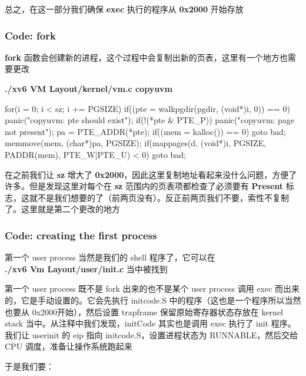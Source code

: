 总之，在这一部分我们确保 \textbf{exec} 执行的程序从 \textbf{0x2000} 开始存放

\subsubsection{Code: fork}

\textbf{fork} 函数会创建新的进程，这个过程中会复制出新的页表，这里有一个地方也需要更改

\textbf{./xv6 VM Layout/kernel/vm.c copyuvm}

\begin{ccode}
    for(i = 0; i < sz; i += PGSIZE){
        if((pte = walkpgdir(pgdir, (void*)i, 0)) == 0)
        panic("copyuvm: pte should exist");
        if(!(*pte & PTE_P))
        panic("copyuvm: page not present");
        pa = PTE_ADDR(*pte);
        if((mem = kalloc()) == 0)
        goto bad;
        memmove(mem, (char*)pa, PGSIZE);
        if(mappages(d, (void*)i, PGSIZE, PADDR(mem), PTE_W|PTE_U) < 0)
        goto bad;
    }
\end{ccode}

在之前我们让 \textbf{sz} 增大了 \textbf{0x2000}，因此这里复制地址看起来没什么问题，方便了许多。但是发现这里对每个在 \textbf{sz} 范围内的页表项都检查了必须要有 \textbf{Present} 标志，这就不是我们想要的了（前两页没有）。反正前两页我们不要，索性不复制了。这里就是第二个更改的地方

\begin{ccode}
    // for(i = 0; i < sz; i += PGSIZE){
    for (i=0x2000; i<sz; i += PGSIZE){
\end{ccode}

\subsubsection{Code: creating the first process}

第一个 user process 当然是我们的 shell 程序了，它可以在 \\
\textbf{./xv6 Vm Layout/user/init.c} 当中被找到

第一个 user process 既不是 fork 出来的也不是某个 user process 调用 exec 而出来的，它是手动设置的。它会先执行 initcode.S 中的程序（这也是一个程序所以当然也要从 0x2000开始），然后设置 trapframe 保留原始寄存器状态存放在 kernel stack 当中。从注释中我们发现，initCode 其实也是调用 exec 执行了 init 程序。我们让 userinit 的 eip 指向 initcode.S，设置进程状态为 RUNNABLE，然后交给 CPU 调度，准备让操作系统跑起来

于是我们要：

